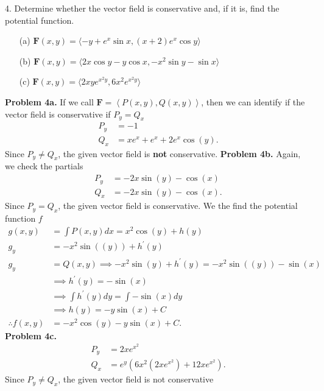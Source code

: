 \documentclass{report}
\begin{document}
    \bigbreak \noindent 
    \begin{mdframed}
        4. Determine whether the vector field is conservative and, if it is, find the potential function.
        \begin{enumerate}
            \item[(a)] \(\mathbf{F}(x, y) = \langle -y + e^x \sin x, (x + 2)e^x \cos y \rangle\)
            \item[(b)] \(\mathbf{F}(x, y) = \langle 2x \cos y - y \cos x, -x^2 \sin y - \sin x \rangle\)
            \item[(c)] \(\mathbf{F}(x, y) = \langle 2xye^{x^2y}, 6x^2 e^{x^2y} \rangle\)
        \end{enumerate}
    \end{mdframed}
    \bigbreak \noindent 
    \textbf{Problem 4a.} If we call $\mathbf{F} = \left\langle P(x,y), Q(x,y) \right\rangle $, then we can identify if the vector field is conservative if $P_{y} = Q_{x}$
    \begin{align*}
        P_{y} &= -1  \\
        Q_{x} &= xe^{x} + e^{x} + 2e^{x}\cos{\left(y\right)}
    .\end{align*}
    \bigbreak \noindent 
    Since $P_{y} \ne Q_{x}$, the given vector field is \textbf{not} conservative.
    \bigbreak \noindent 
    \textbf{Problem 4b.} Again, we check the partials
    \begin{align*}
        P_{y} &= -2x\sin{\left(y\right)} - \cos{\left(x\right)} \\
        Q_{x} &=-2x\sin{\left(y\right)} - \cos{\left(x\right)}
    .\end{align*}
    \bigbreak \noindent 
    Since $P_{y} = Q_{x}$, the given vector field is conservative. We the find the potential function $f$
    \begin{align*}
        g(x,y) &= \int P(x,y)dx = x^{2}\cos{\left(y\right)} + h(y) \\
        g_{y} &= -x^{2}\sin{\left((y)\right)} + h^{\prime}(y) \\
        g_{y} &= Q(x,y) \implies -x^{2}\sin{\left(y\right)} + h^{\prime}(y) = -x^{2}\sin{\left((y)\right)} -\sin{\left(x\right)} \\
              &\implies h^{\prime}(y) = -\sin{\left(x\right)} \\
              &\implies \int h^{\prime}(y)dy = \int -\sin{\left(x\right)}dy \\
              &\implies h(y) = -y\sin{\left(x\right)} + C \\
        \therefore f(x,y) &= -x^{2}\cos{\left(y\right)} -y\sin{\left(x\right)} + C
    .\end{align*}
    \bigbreak \noindent 
    \textbf{Problem 4c.}
    \begin{align*}
        P_{y} &= 2xe^{x^{2}} \\
        Q_{x} &= e^{y}(6x^{2}(2xe^{x^{2}}) + 12xe^{x^{2}})
    .\end{align*}
    \bigbreak \noindent 
    Since $P_{y} \ne Q_{x}$, the given vector field is not conservative
\end{document}
